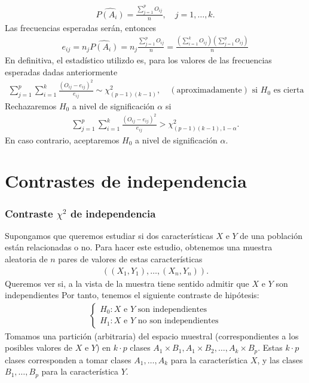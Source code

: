 \begin{align*}
    \widehat{P(A_i)} = \frac{\sum_{j=1}^{p} O_{ij}}{n}, \quad j = 1,\ldots,k.
\end{align*}
Las frecuencias esperadas serán, entonces
\begin{align*}
    e_{ij} = n_j \widehat{P(A_i)} = n_j  \frac{\sum_{j=1}^{p} O_{ij}}{n} = \frac{\left(\sum_{i=1}^{k} O_{ij}\right)\left(\sum_{j=1}^{p} O_{ij}\right)}{n}
\end{align*}
En definitiva, el estadístico utilizdo es, para los valores de las frecuencias esperadas dadas anteriormente
\begin{align*}
    \sum_{j=1}^{p}\sum_{i=1}^{k} \frac{(O_{ij} - e_{ij})^2}{e_{ij}} \sim \chi^2_{(p-1)(k-1)}, \quad (\text{aproximadamente}) \text{ si $H_0$ es cierta}
\end{align*}
Rechazaremos $H_0$ a nivel de significación $\alpha$ si
\begin{align*}
    \sum_{j=1}^{p}\sum_{i=1}^{k} \frac{(O_{ij} - e_{ij})^2}{e_{ij}} > \chi^2_{(p-1)(k-1), 1 - \alpha}.
\end{align*}
En caso contrario, aceptaremos $H_0$ a nivel de significación $\alpha$.

\section{Contrastes de independencia}

\subsubsection{Contraste $\chi^2$ de independencia}

Supongamos que queremos estudiar si dos características $X$ e $Y$ de una población están relacionadas o no. Para hacer este estudio, obtenemos una muestra aleatoria de $n$ pares de valores de estas características
\begin{align*}
    ((X_1,Y_1), \ldots, (X_n,Y_n)).
\end{align*}
Queremos ver si, a la vista de la muestra tiene sentido admitir que $X$ e $Y$ son independientes Por tanto, tenemos el siguiente contraste de hipótesis:
\begin{align*}
    \begin{cases}
        H_0 : \text{$X$ e $Y$ son independientes} \\
        H_1 : \text{$X$ e $Y$ no son independientes}
    \end{cases}
\end{align*}
Tomamos una partición (arbitraria) del espacio muestral (correspondientes a los posibles valores de $X$ e $Y$) en $k \cdot p$ clases $A_1 \times B_1, A_1 \times B_2, \ldots, A_k \times B_p$. Estas $k \cdot p$ clases corresponden a tomar clases $A_1, \ldots, A_k$ para la característica $X$, y las clases $B_1, \ldots, B_p$ para la característica $Y$.

